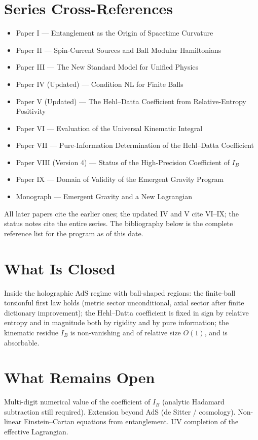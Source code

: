 \documentclass[11pt]{article}
\begin{document}
\section{Series Cross-References}
\begin{itemize}[leftmargin=1.4em]
\item Paper I --- Entanglement as the Origin of Spacetime Curvature
\item Paper II --- Spin-Current Sources and Ball Modular Hamiltonians
\item Paper III --- The New Standard Model for Unified Physics
\item Paper IV (Updated) --- Condition NL for Finite Balls
\item Paper V (Updated) --- The Hehl--Datta Coefficient from Relative-Entropy Positivity
\item Paper VI --- Evaluation of the Universal Kinematic Integral
\item Paper VII --- Pure-Information Determination of the Hehl--Datta Coefficient
\item Paper VIII (Version 4) --- Status of the High-Precision Coefficient of $I_B$
\item Paper IX --- Domain of Validity of the Emergent Gravity Program
\item Monograph --- Emergent Gravity and a New Lagrangian
\end{itemize}
All later papers cite the earlier ones; the updated IV and V cite VI--IX;
the status notes cite the entire series. The bibliography below is the
complete reference list for the program as of this date.

\section{What Is Closed}
Inside the holographic AdS regime with ball-shaped regions:
the finite-ball torsionful first law holds (metric sector unconditional,
axial sector after finite dictionary improvement); the Hehl--Datta
coefficient is fixed in sign by relative entropy and in magnitude both
by rigidity and by pure information; the kinematic residue $I_B$ is
non-vanishing and of relative size $O(1)$, and is absorbable.

\section{What Remains Open}
Multi-digit numerical value of the coefficient of $I_B$ (analytic
Hadamard subtraction still required). Extension beyond AdS (de Sitter /
cosmology). Non-linear Einstein--Cartan equations from entanglement.
UV completion of the effective Lagrangian.
\end{document}

